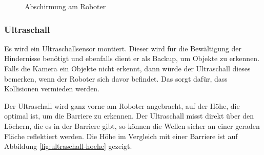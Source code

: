 \begin{figure}[H]
\begin{minipage}[b]{0.45\textwidth}
  \caption{Abschirmung am Roboter}
  \label{fig:abschirmung-robi}
\end{minipage}
\end{figure}


\subsubsection{Ultraschall}

Es wird ein Ultraschallsensor montiert. Dieser wird für die Bewältigung der Hindernisse benötigt und ebenfalls dient er als Backup, um Objekte zu erkennen. Falls die Kamera ein Objekte nicht erkennt, dann würde der Ultraschall dieses bemerken, wenn der Roboter sich davor befindet. Das sorgt dafür, dass Kollisionen vermieden werden.

Der Ultraschall wird ganz vorne am Roboter angebracht, auf der Höhe, die optimal ist, um die Barriere zu erkennen. Der Ultraschall misst direkt über den Löchern, die es in der Barriere gibt, so können die Wellen sicher an einer geraden Fläche reflektiert werden. Die Höhe im Vergleich mit einer Barriere ist auf Abbildung \ref{fig:ultraschall-hoehe} gezeigt.

